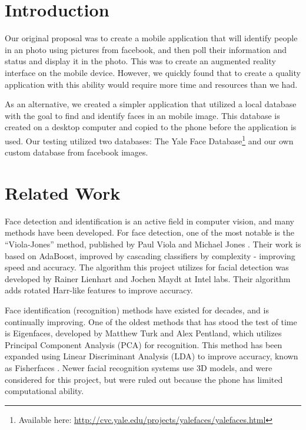 \section{Introduction} %

Our original proposal was to create a mobile application that will
identify people in an photo using pictures from facebook, and then
poll their information and status and display it in the photo.  This
was to create an augmented reality interface on the mobile device.
However, we quickly found that to create a quality application with
this ability would require more time and resources than we had.

As an alternative, we created a simpler application that utilized a
local database with the goal to find and identify faces in an mobile
image.  This database is created on a desktop computer and copied to
the phone before the application is used.  Our testing utilized two
databases: The Yale Face Database\footnote{Available here:
  \url{http://cvc.yale.edu/projects/yalefaces/yalefaces.html}}
\cite{YaleFace} and our own custom database from facebook images.

\section{Related Work} %

Face detection and identification is an active field in computer
vision, and many methods have been developed.  For face detection, one
of the most notable is the ``Viola-Jones'' method, published by Paul
Viola and Michael Jones \cite{ViolaJones}.  Their work is based on
AdaBoost\cite{AdaBoost}, improved by cascading classifiers by
complexity - improving speed and accuracy.  The algorithm this project
utilizes for facial detection was developed by Rainer Lienhart and
Jochen Maydt at Intel labs.\cite{Lienhart} Their algorithm adds
rotated Harr-like features to improve accuracy.

Face identification (recognition) methods have existed for decades,
and is continually improving.  One of the oldest methods that has
stood the test of time is Eigenfaces\cite{Eigenfaces}, developed by
Matthew Turk and Alex Pentland, which utilizes Principal Component
Analysis (PCA) for recognition.  This method has been expanded using
Linear Discriminant Analysis (LDA) to improve accuracy, known as
Fisherfaces \cite{Fisherfaces}.  Newer facial recognition systems use
3D models\cite{3d}, and were considered for this project, but were
ruled out because the phone has limited computational ability.




